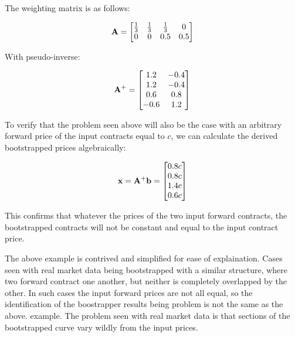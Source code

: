 \documentclass{article}
\begin{document}
The weighting matrix is as follows:

\begin{equation}
    \mathbf{A} = \begin{bmatrix}
        \frac{1}{3} & \frac{1}{3} & \frac{1}{3} & 0 \\
        0 & 0 & 0.5 & 0.5
    \end{bmatrix}
\end{equation}

With pseudo-inverse:

\begin{equation}
    \mathbf{A}^+ = \begin{bmatrix}
        1.2 & -0.4 \\
        1.2 & -0.4 \\
        0.6 & 0.8 \\
        -0.6 & 1.2 \\
    \end{bmatrix}
\end{equation}

To verify that the problem seen above will also be the case with an arbitrary forward
price of the input contracts equal to $c$, we can calculate the derived bootstrapped 
prices algebraically:

\begin{equation}
    \mathbf{x} = \mathbf{A}^+ \mathbf{b} = \begin{bmatrix}
            0.8c \\
            0.8c \\
            1.4c \\
            0.6c \\
        \end{bmatrix}
\end{equation}

This confirms that whatever the prices of the two input forward contracts, the bootstrapped
contracts will not be constant and equal to the input contract price.

\bigskip

The above example is contrived and simplified for ease of explaination.
Cases seen with real market data being bootstrapped with a similar structure, where
two forward contract one another, but neither is completely overlapped by the other.
In such cases the input forward prices are not all equal, so the identification
of the boostrapper results being problem is not the same as the above.
example. The problem seen with real market data is that sections of the bootstrapped
curve vary wildly from the input prices.
\end{document}
